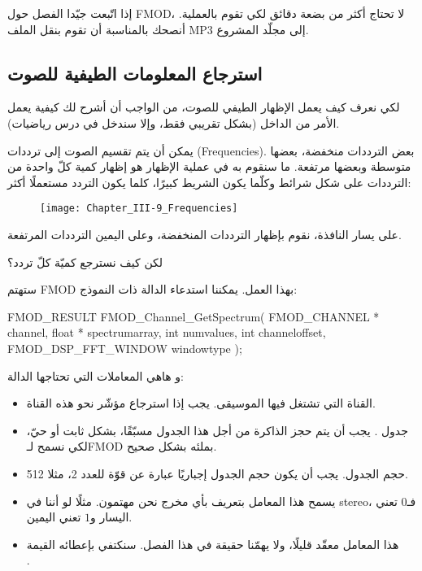 إذا اتّبعت جيّدا الفصل حول
\textenglish{FMOD}،
لا تحتاج أكثر من بضعة دقائق لكي تقوم بالعملية. أنصحك بالمناسبة أن تقوم بنقل الملف
\textenglish{MP3}
إلى مجلّد المشروع.

\subsection{استرجاع المعلومات الطيفية للصوت}

لكي نعرف كيف يعمل الإظهار الطيفي للصوت، من الواجب أن أشرح لك كيفية يعمل الأمر من الداخل (بشكل تقريبي فقط، وإلا سندخل في درس رياضيات).

يمكن أن يتم تقسيم الصوت إلى ترددات 
(\textenglish{Frequencies}).
بعض الترددات منخفضة، بعضها متوسطة وبعضها مرتفعة. ما سنقوم به في عملية الإظهار هو إظهار كمية كلّ واحدة من الترددات على شكل شرائط وكلّما يكون الشريط كبيرًا، كلما يكون التردد مستعملًا أكثر:

\begin{figure}[H]
	\centering
	\texttt{[image: Chapter\_III-9\_Frequencies]}
\end{figure}

على يسار النافذة، نقوم بإظهار الترددات المنخفضة، وعلى اليمين الترددات المرتفعة.

\begin{question}
لكن كيف نسترجع كميّة كلّ تردد؟
\end{question}

ستهتم
\textenglish{FMOD}
بهذا العمل. يمكننا استدعاء الدالة
ذات النموذج:

\begin{Csource}
FMOD_RESULT FMOD_Channel_GetSpectrum(
	FMOD_CHANNEL *  channel,
	float *  spectrumarray,
	int  numvalues,
	int  channeloffset,
	FMOD_DSP_FFT_WINDOW  windowtype
);
\end{Csource}

و هاهي المعاملات التي تحتاجها الدالة:

\begin{itemize}
	\item القناة التي تشتغل فيها الموسيقى. يجب إذا استرجاع مؤشّر نحو هذه القناة.
	\item جدول
	.
	يجب أن يتم حجز الذاكرة من أجل هذا الجدول مسبّقًا، بشكل ثابت أو حيّ، لكي نسمح لـ\textenglish{FMOD}
	بملئه بشكل صحيح.
	\item حجم الجدول. يجب أن يكون حجم الجدول إجباريًا عبارة عن قوّة للعدد 2، مثلا 512.
	\item يسمح هذا المعامل بتعريف بأي مخرج نحن مهتمون. مثلًا لو أننا في
	\textenglish{stereo}،
	فـ$ 0 $ تعني اليسار و$ 1 $ تعني اليمين.
	\item هذا المعامل معقّد قليلًا، ولا يهمّنا حقيقة في هذا الفصل. سنكتفي بإعطائه القيمة\\ 
	.
\end{itemize}

